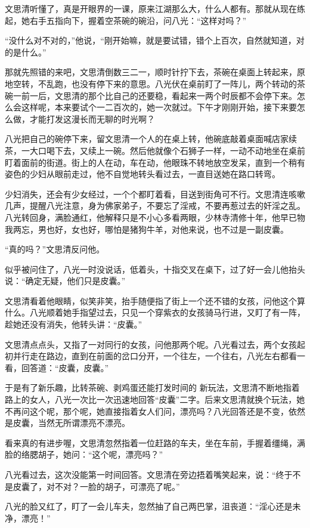 文思清听懂了，真是开眼界的一课，原来江湖那么大，什么人都有。那就从现在练起，她右手五指向下，握着空茶碗的碗沿，问八光：“这样对吗？”

“没什么对不对的，”他说，“刚开始嘛，就是要试错，错个上百次，自然就知道，对的是什么。”

那就先照错的来吧，文思清倒数三二一，顺时针拧下去，茶碗在桌面上转起来，原地空转，不乱跑，也没有停下来的意思。八光伏在桌前盯了一阵儿，两个转动的茶碗一前一后，文思清的那个比自己的还要稳，看起来一两个时辰都不会停下来。怎么会这样呢，本来要试个一二百次的，她一次就过。下午才刚刚开始，接下来要怎么做，才能打发这漫长而无聊的时光啊？

八光把自己的碗停下来，留文思清一个人的在桌上转，他碗底敲着桌面喊店家续茶，一大口喝下去，又续上一碗。然后他就像个石狮子一样，一动不动地坐在桌前盯着面前的街道。街上的人在动，车在动，他眼珠不转地放空发呆，直到一个稍有姿色的少妇从眼前走过，他不自觉地转头看过去，一直目送她在路口转弯。

少妇消失，还会有少女经过，一个个都盯着看，目送到街角可不行。文思清连咳嗽几声，提醒八光注意，身为佛家弟子，不要忘了淫戒，不要再惹过去的奸淫之乱。八光转回身，满脸通红，他解释只是不小心多看两眼，少林寺清修十年，他早已物我两忘，男也好，女也好，哪怕是猪狗牛羊，对他来说，也不过是一副皮囊。

“真的吗？”文思清反问他。

似乎被问住了，八光一时没说话，低着头，十指交叉在桌下，过了好一会儿他抬头说：“确定无疑，他们只是皮囊。”

文思清看着他眼睛，似笑非笑，抬手随便指了街上一个还不错的女孩，问他这个算什么。八光顺着她手指望过去，只见一个穿紫衣的女孩骑马行进，又盯了有一阵，趁她还没有消失，他转头讲：“皮囊。”

文思清点点头，又指了一对同行的女孩，问他那两个呢。八光看过去，两个女孩起初并行走在路边，直到在前面的岔口分开，一个往左，一个往右，八光左右都看一看，回答道：“皮囊，皮囊。”

于是有了新乐趣，比转茶碗、剥鸡蛋还能打发时间的
新玩法，文思清不断地指着路上的女人，八光一次比一次迅速地回答“皮囊”二字。后来文思清就换个玩法，她不再问这个呢，那个呢，她直接指着女人们问，漂亮吗？八光回答还是不变，依然是皮囊，当然无所谓漂亮不漂亮。

看来真的有进步喔，文思清忽然指着一位赶路的车夫，坐在车前，手握着缰绳，满脸的络腮胡子，她问：“这个呢，漂亮吗？”

八光看过去，这次没能第一时间回答。文思清在旁边捂着嘴笑起来，说：“终于不是皮囊了，对不对？一脸的胡子，可漂亮了呢。”

八光的脸又红了，盯了一会儿车夫，忽然抽了自己两巴掌，沮丧道：“淫心还是未净，漂亮！”

